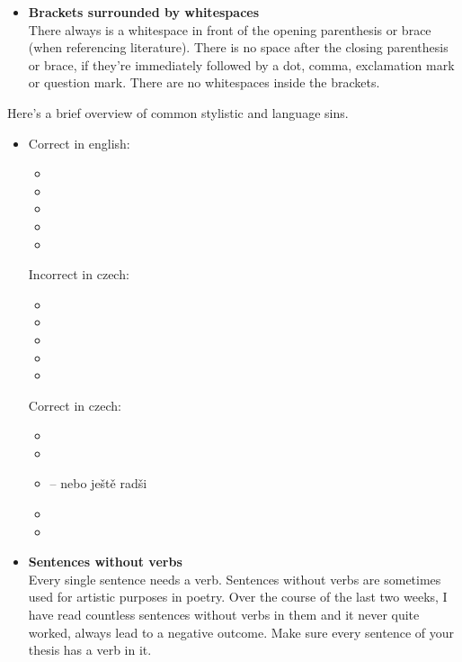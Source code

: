 {{\begin{itemize}
{Hyphens occur in our IT theses very rarely (at least they should). A good example would be phrases or joining subjects ``Rh-factor'', ``real-time'', ``propane-butane''.
	}
    \item{
    	\textbf{Brackets surrounded by whitespaces} \\
        There always is a whitespace in front of the opening parenthesis or brace (when referencing literature). There is no space after the closing parenthesis or brace, if they're immediately followed by a dot, comma, exclamation mark or question mark. There are no whitespaces inside the brackets.
    }
\end{itemize}

\noindent Here's a brief overview of common stylistic and language sins.

\begin{itemize}
	\item{
    	Correct in english:
		\begin{itemize}
  			\item{}
  			\item{}
  			\item{}
  			\item{}
  			\item{}
		\end{itemize}

        Incorrect in czech:
        \begin{itemize}
          \item{}
          \item{}
          \item{}
          \item{}
          \item{}
        \end{itemize}

        Correct in czech:
        \begin{itemize}
          \item{}
          \item{}
          \item{ -- nebo ještě radši }
          \item{}
          \item{}
        \end{itemize}
    }
    \item{
    	\textbf{Sentences without verbs} \\
        Every single sentence needs a verb. Sentences without verbs are sometimes used for artistic purposes in poetry. Over the course of the last two weeks, I have read countless sentences without verbs in them and it never quite worked, always lead to a negative outcome. Make sure every sentence of your thesis has a verb in it.
    }
\end{itemize}

}}
